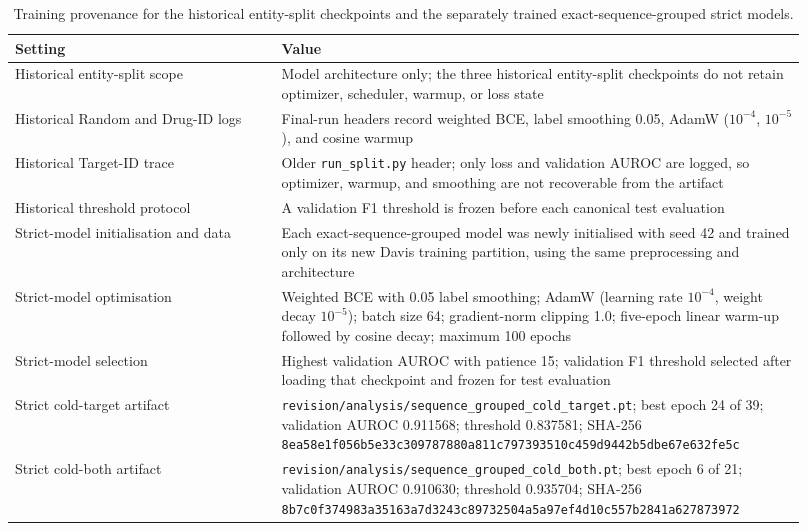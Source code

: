 \documentclass[11pt]{article}
\begin{document}
\begin{table}[H]
\centering
\caption{Training provenance for the historical entity-split checkpoints and the
separately trained exact-sequence-grouped strict models.}
\small
\begin{tabular}{p{0.31\linewidth}p{0.61\linewidth}}
\toprule
Setting & Value \\
\midrule
Historical entity-split scope & Model architecture only; the three historical entity-split checkpoints do not retain optimizer, scheduler, warmup, or loss state \\
Historical Random and Drug-ID logs & Final-run headers record weighted BCE, label smoothing 0.05, AdamW ($10^{-4}$, $10^{-5}$), and cosine warmup \\
Historical Target-ID trace & Older \texttt{run\_split.py} header; only loss and validation AUROC are logged, so optimizer, warmup, and smoothing are not recoverable from the artifact \\
Historical threshold protocol & A validation F1 threshold is frozen before each canonical test evaluation \\
Strict-model initialisation and data & Each exact-sequence-grouped model was newly initialised with seed 42 and trained only on its new Davis training partition, using the same preprocessing and architecture \\
Strict-model optimisation & Weighted BCE with 0.05 label smoothing; AdamW (learning rate $10^{-4}$, weight decay $10^{-5}$); batch size 64; gradient-norm clipping 1.0; five-epoch linear warm-up followed by cosine decay; maximum 100 epochs \\
Strict-model selection & Highest validation AUROC with patience 15; validation F1 threshold selected after loading that checkpoint and frozen for test evaluation \\
Strict cold-target artifact & \texttt{revision/analysis/sequence\_grouped\_cold\_target.pt}; best epoch 24 of 39; validation AUROC 0.911568; threshold 0.837581; SHA-256 {\scriptsize\texttt{8ea58e1f056b5e33c309787880a811c797393510c459d9442b5dbe67e632fe5c}} \\
Strict cold-both artifact & \texttt{revision/analysis/sequence\_grouped\_cold\_both.pt}; best epoch 6 of 21; validation AUROC 0.910630; threshold 0.935704; SHA-256 {\scriptsize\texttt{8b7c0f374983a35163a7d3243c89732504a5a97ef4d10c557b2841a627873972}} \\
\bottomrule
\end{tabular}
\end{table}
\end{document}
